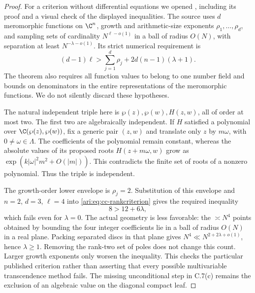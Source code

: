\begin{proof}
For a criterion without differential equations we opened
\citet[Theorem 1, p.~24]{waldschmidt1975dimension}, including
its proof and a visual check of the displayed inequalities.
The source uses $d$ meromorphic functions on $\C^n$, growth and
arithmetic-size exponents $\rho_1,\ldots,\rho_d$, and sampling
sets of cardinality $N^{\ell-o(1)}$ in a ball of radius $O(N)$,
with separation at least $N^{-\lambda-o(1)}$. Its strict numerical
requirement is
\begin{equation}\label{ari:eq:cc-rankcriterion}
 (d-1)\ell>\sum_{j=1}^d\rho_j
                     +2d(n-1)(\lambda+1).
\end{equation}
The theorem also requires all function values to belong to
one number field and bounds on denominators in the entire
representations of the meromorphic functions. We do not
silently discard these hypotheses.

The natural independent triple here is
$\wp(z),\wp(w),H(z,w)$, all of order at most two.
The first two are algebraically independent. If $H$ satisfied
a polynomial over $\C(\wp(z),\wp(w))$, fix a generic pair
$(z,w)$ and translate only $z$ by $m\omega$, with
$0\ne\omega\in\Lambda$. The coefficients of the polynomial
remain constant, whereas the absolute values of its proposed
roots $H(z+m\omega,w)$ grow as
$\exp(k|\omega|^2m^2+O(|m|))$. This contradicts the finite
set of roots of a nonzero polynomial. Thus the triple is
independent.

The growth-order lower envelope is $\rho_j=2$. Substitution of
this envelope and $n=2$, $d=3$, $\ell=4$ into
\eqref{ari:eq:cc-rankcriterion} gives the required inequality
\[
 8>12+6\lambda,
\]
which fails even for $\lambda=0$. The actual geometry is
less favorable: the $\asymp N^4$ points obtained by bounding
the four integer coefficients lie in a ball of radius $O(N)$
in a real plane. Packing separated discs in that plane gives
$N^4\ll N^{2+2\lambda+o(1)}$, hence $\lambda\ge1$.
Removing the rank-two set of poles does not change this count.
Larger growth exponents only worsen the inequality. This
checks the particular published criterion rather than asserting
that every possible multivariable transcendence method fails.
The missing unconditional step in C.7(c) remains the exclusion
of an algebraic value on the diagonal compact leaf.
\end{proof}
